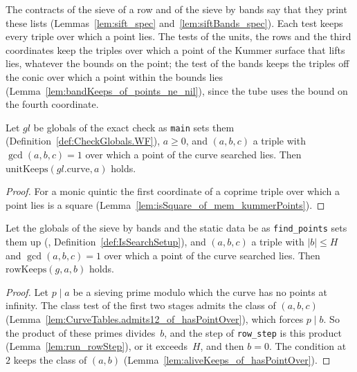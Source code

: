 The contracts of the sieve of a row and of the sieve by bands say that they print these lists
(Lemmas~\ref{lem:sift_spec} and~\ref{lem:siftBands_spec}). Each test keeps every triple over which
a point lies. The tests of the units, the rows and the third coordinates keep the triples over
which a point of the Kummer surface that lifts lies, whatever the bounds on the point; the test of
the bands keeps the triples off the conic over which a point within the bounds lies
(Lemma~\ref{lem:bandKeeps_of_points_ne_nil}), since the tube uses the bound on the fourth
coordinate.

\begin{lemma}\label{lem:unitKeeps_of_hasPointOver}
  \leanok
  Let $\mathit{gl}$ be globals of the exact check as \texttt{main} sets them
  (Definition~\ref{def:CheckGlobals.WF}), $a \ge 0$, and $(a, b, c)$ a triple with
  $\gcd(a, b, c) = 1$ over which a point of the curve searched lies. Then
  $\mathrm{unitKeeps}(\mathit{gl}.\mathrm{curve}, a)$ holds.
\end{lemma}

\begin{proof}
  \leanok
  For a monic quintic the first coordinate of a coprime triple over which a point lies is a square
  (Lemma~\ref{lem:isSquare_of_mem_kummerPoints}).
\end{proof}

\begin{lemma}\label{lem:rowKeeps_of_hasPointOver}
  \leanok
  Let the globals of the sieve by bands and the static data be as \texttt{find\_points} sets them up
  (, Definition~\ref{def:IsSearchSetup}), and $(a, b, c)$ a triple with
  $|b| \le H$ and $\gcd(a, b, c) = 1$ over which a point of the curve searched lies. Then
  $\mathrm{rowKeeps}(g, a, b)$ holds.
\end{lemma}

\begin{proof}
  \leanok
  Let $p \mid a$ be a sieving prime modulo which the curve has no points at infinity. The class test
  of the first two stages admits the class of $(a, b, c)$
  (Lemma~\ref{lem:CurveTables.admits12_of_hasPointOver}), which forces $p \mid b$. So the product
  of these primes divides~$b$, and the step of \texttt{row\_step} is this product
  (Lemma~\ref{lem:run_rowStep}), or it exceeds~$H$, and then $b = 0$. The condition at~$2$ keeps
  the class of $(a, b)$ (Lemma~\ref{lem:aliveKeeps_of_hasPointOver}).
\end{proof}

